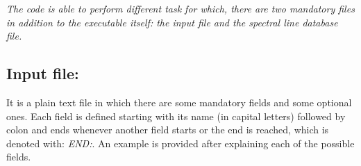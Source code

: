 %
\label{sect:execution}
%

{\it The code is able to perform different task for which, there are two mandatory files in addition to the executable itself: the input file and the spectral line database file.}
%
\subsection{Input file:}
It is a plain text file in which there are some mandatory fields and some optional ones. Each field is defined starting with its name (in capital letters) followed by colon and ends whenever another field starts or the end is reached, which is denoted with: {\it END:}. An example is provided after explaining each of the possible fields.\\

